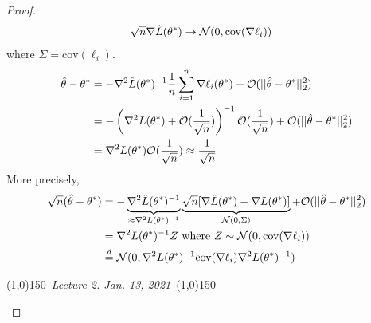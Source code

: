 \documentclass[11pt]{article}
\newcommand{\thetahat}[0]{\hat{\theta}}
\newcommand{\eqd}[0]{\overset{d}{=}}
\newcommand{\inv}[0]{^{-1}}
\newcommand{\cov}[0]{\text{cov}}
\begin{document}
\begin{proof}
\begin{align}
			\sqrt{n}\nabla \hat{L}(\theta^*) &\to \mc{N}(0, \cov(\nabla \ell_i))
		\end{align}
		where $\Sigma = \cov(\ell_i)$.
		\begin{align}
			\thetahat - \theta^* &= - \nabla^2 \hat{L}(\theta^*)\inv \frac{1}{n}\sum_{i=1}^n \nabla \ell_i(\theta^*) + \mc{O}(\norm{\thetahat - \theta^*}_2^2) \\
			&= - \left(\nabla^2 L(\theta^*) + \mc{O}(\frac{1}{\sqrt{n}})\right)\inv \mc{O}(\frac{1}{\sqrt{n}}) + \mc{O}(\norm{\thetahat - \theta^*}_2^2) \\
			&= \nabla^2 L(\theta^*) \mc{O}(\frac{1}{\sqrt{n}}) \approx \frac{1}{\sqrt{n}}
		\end{align}
		More precisely,
		\begin{align}
			\sqrt{n}(\thetahat - \theta^*) &= - \underbrace{\nabla^2 \hat{L}(\theta^*)\inv}_{\approx \nabla^2 L(\theta^*)\inv}
			\underbrace{\sqrt{n}[\nabla \hat{L}(\theta^*) - \nabla L(\theta^*)]}_{\mc{N}(0, \Sigma)}
			+ \mc{O}(\norm{\thetahat - \theta^*}_2^2) \\
			&= \nabla^2 L(\theta^*)\inv Z \tx{ where } Z \sim \mc{N}(0, \cov(\nabla \ell_i)) \\
			&\eqd \mc{N}(0, \nabla^2 L(\theta^*)\inv \cov(\nabla \ell_i) \nabla^2 L(\theta^*)\inv)
		\end{align}

	\begin{center}
	\line(1,0){150}\ \emph{Lecture 2. Jan. 13, 2021}\ \line(1,0){150}
	\end{center}


\end{proof}
\end{document}
